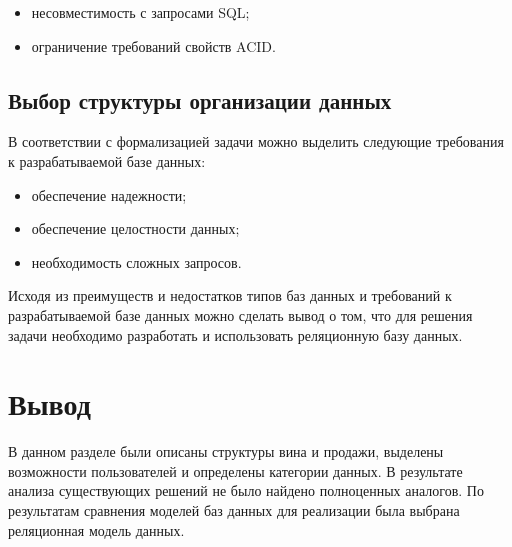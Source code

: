 \begin{itemize}
	\item несовместимость с запросами SQL;
	\item ограничение требований свойств ACID.
\end{itemize}

\subsection{Выбор структуры организации данных}

В соответствии с формализацией задачи можно выделить следующие требования к разрабатываемой базе данных:

\begin{itemize}
	\item обеспечение надежности;
	\item обеспечение целостности данных;
	\item необходимость сложных запросов.
\end{itemize}

Исходя из преимуществ и недостатков типов баз данных и требований к разрабатываемой базе данных можно сделать вывод о том, что для решения задачи необходимо разработать и использовать реляционную базу данных.

\section*{Вывод}

В данном разделе были описаны структуры вина и продажи, выделены возможности пользователей и определены категории данных. В результате анализа существующих решений не было найдено полноценных аналогов. По результатам сравнения моделей баз данных для реализации была выбрана реляционная модель данных.
